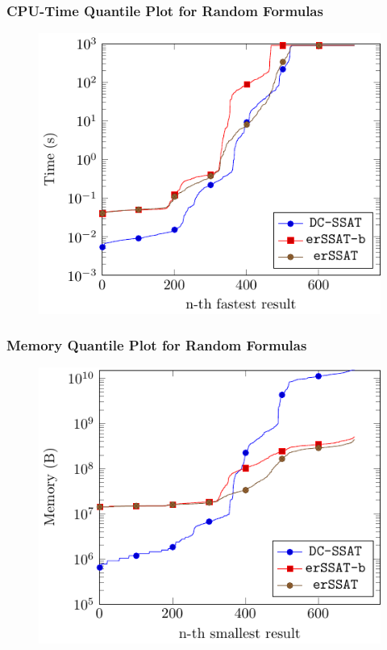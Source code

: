 \begin{frame}
    \frametitle{CPU-Time Quantile Plot for Random Formulas}
    \begin{figure}
        \centering
        \includegraphics{fig/exist-random-ssat/quantile-cputime-Random.pdf}
    \end{figure}
\end{frame}

\begin{frame}
    \frametitle{Memory Quantile Plot for Random Formulas}
    \begin{figure}
        \centering
        \includegraphics{fig/exist-random-ssat/quantile-memory-Random.pdf}
    \end{figure}
\end{frame}

